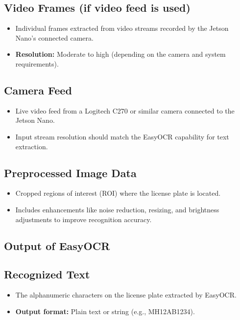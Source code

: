 \subsection*{Video Frames (if video feed is used)}
\begin{itemize}
	\item Individual frames extracted from video streams recorded by the Jetson Nano’s connected camera.
	\item \textbf{Resolution:} Moderate to high (depending on the camera and system requirements).
\end{itemize}

\subsection*{Camera Feed}
\begin{itemize}
	\item Live video feed from a Logitech C270 or similar camera connected to the Jetson Nano.
	\item Input stream resolution should match the EasyOCR capability for text extraction.
\end{itemize}

\subsection*{Preprocessed Image Data}
\begin{itemize}
	\item Cropped regions of interest (ROI) where the license plate is located.
	\item Includes enhancements like noise reduction, resizing, and brightness adjustments to improve recognition accuracy.
\end{itemize}

\subsection{Output of EasyOCR}
\subsection*{Recognized Text}
\begin{itemize}
	\item The alphanumeric characters on the license plate extracted by EasyOCR.
	\item \textbf{Output format:} Plain text or string (e.g., MH12AB1234).
\end{itemize}

